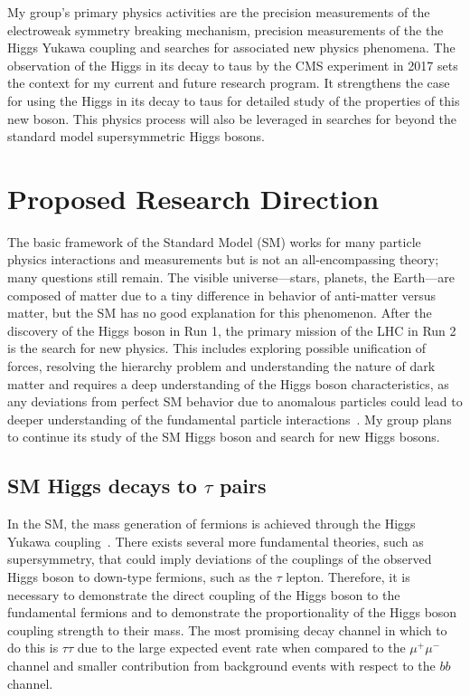 \documentclass[preprint,12pt]{elsarticle}
\begin{document}
My group's primary physics activities are the precision measurements of the electroweak symmetry breaking mechanism, 
precision measurements of the the Higgs Yukawa coupling and searches for associated new physics phenomena. 
The observation of the Higgs in its decay to taus by the CMS experiment in 2017 sets the context for my 
current and future research program. It strengthens the case for using the Higgs in its decay to taus for 
detailed study of the properties of this new boson. 
This physics process will also be leveraged in searches for beyond the standard model supersymmetric Higgs bosons. 

\section{Proposed Research Direction}

The basic framework of the Standard Model (SM) works for many particle physics interactions and 
measurements but is not an all-encompassing theory; many questions still remain. The visible 
universe---stars, planets, the Earth---are composed of matter due to a tiny difference in behavior 
of anti-matter versus matter, but the SM has no good explanation for this phenomenon. %
After the discovery of the Higgs boson in Run 1, the primary mission of the LHC in Run 2 is 
the search for new physics. This includes exploring possible unification of forces, resolving the hierarchy problem 
and understanding the nature of dark matter and requires a 
deep understanding of the Higgs boson characteristics, as any deviations from perfect SM 
behavior due to anomalous particles could lead to deeper understanding of the fundamental particle 
interactions~\cite{Curtin:2013fra}. My group plans to continue its study of the SM Higgs 
boson and search for new Higgs bosons. 

\subsection{SM Higgs decays to $\tau$ pairs}
In the SM, the mass generation of fermions is achieved through the Higgs Yukawa coupling~\cite{Higgs:1966ev,Denner:2011mq}.
There exists several more fundamental theories, such as supersymmetry, %
that could imply deviations of the couplings of the observed Higgs boson to down-type fermions, such as
the $\tau$ lepton. Therefore, it is necessary to demonstrate the direct coupling of the Higgs boson to the fundamental fermions and to demonstrate
the proportionality of the Higgs boson coupling strength to their mass. 
The most promising decay channel in which to do this is 
$\tau\tau$ due to the large expected event rate when compared to the $\mu^{+}\mu^{-}$ 
channel and smaller contribution from background events with respect to the $bb$ channel.
\end{document}
